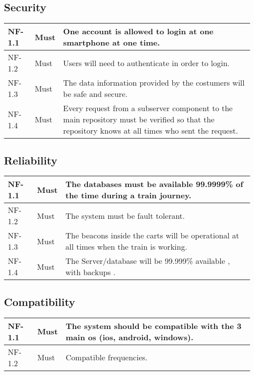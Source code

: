 \subsection{Security}
{
  \renewcommand{\arraystretch}{1.5}
  \begin{table}[H]
    \centering
    \begin{tabularx}{\textwidth}{l|l|X}
      NF-1.1 &Must & One account is allowed to login at one smartphone at one time.\\ \hline
      NF-1.2 &Must & Users will need to authenticate in order to login. \\ \hline
      NF-1.3 &Must & The data information provided by the costumers will be safe and secure. \\ \hline
      NF-1.4 &Must & Every request from a subserver component to the main repository must be verified so that the repository knows at all times who sent the request. \\  
    \end{tabularx}
  \end{table}
}

\subsection{Reliability}
{
  \renewcommand{\arraystretch}{1.5}
  \begin{table}[H]
    \centering
    \begin{tabularx}{\textwidth}{l|l|X}
      NF-1.1 &Must & The databases must be available 99.9999\% of the time during a train journey.\\ \hline
      NF-1.2 &Must & The system must be fault tolerant.  \\ \hline
      NF-1.3 &Must & The beacons inside the carts will be operational at all times when the train is working. \\ \hline
      NF-1.4 &Must & The Server/database will be 99.999\% available , with backups . \\  
    \end{tabularx}
  \end{table}
}

\subsection{Compatibility}
{
  \renewcommand{\arraystretch}{1.5}
  \begin{table}[H]
    \centering
    \begin{tabularx}{\textwidth}{l|l|X}
      NF-1.1 &Must & The system should be compatible with the 3 main os (ios, android, windows). \\ \hline
      NF-1.2 &Must & Compatible frequencies. \\ 
     
    \end{tabularx}
  \end{table}
}


